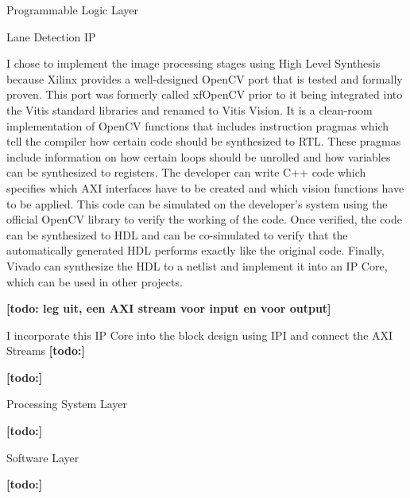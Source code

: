 \documentclass{matthijs}
\begin{document}
	\begin{hoofdstuk}{Programmable Logic Layer}

		\begin{paragraaf}{Lane Detection IP}

			I chose to implement the image processing stages using High Level Synthesis because Xilinx provides a well-designed OpenCV port that is tested and formally proven.
			This port was formerly called xfOpenCV prior to it being integrated into the Vitis standard libraries and renamed to Vitis Vision.
			It is a clean-room implementation of OpenCV functions that includes instruction pragmas which tell the compiler how certain code should be synthesized to RTL.
			These pragmas include information on how certain loops should be unrolled and how variables can be synthesized to registers.
			The developer can write C++ code which specifies which AXI interfaces have to be created and which vision functions have to be applied.
			This code can be simulated on the developer's system using the official OpenCV library to verify the working of the code.
			Once verified, the code can be synthesized to HDL and can be co-simulated to verify that the automatically generated HDL performs exactly like the original code.
			Finally, Vivado can synthesize the HDL to a netlist and implement it into an IP Core, which can be used in other projects.
			

			\bigskip

			\textbf{[todo: leg uit, een AXI stream voor input en voor output]}

			\bigskip

			I incorporate this IP Core into the block design using IPI and connect the AXI Streams
			\textbf{[todo:]}

		\end{paragraaf}

		\textbf{[todo:]}

	\end{hoofdstuk}

	\begin{hoofdstuk}{Processing System Layer}

		\textbf{[todo:]}

	\end{hoofdstuk}
	
	\begin{hoofdstuk}{Software Layer}

		\textbf{[todo:]}

	\end{hoofdstuk}
	
\end{document}

